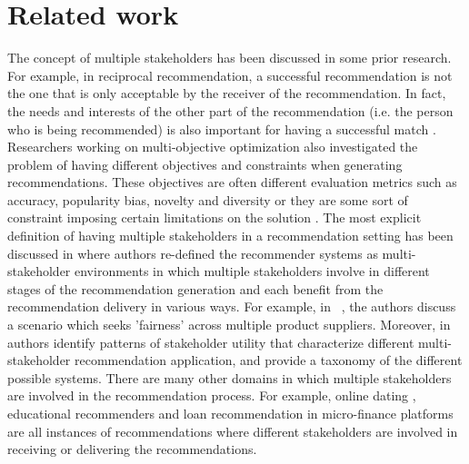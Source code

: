 \section{Related work}
The concept of multiple stakeholders has been discussed in some prior research. For example, in reciprocal recommendation, a successful recommendation is not the one that is only acceptable by the receiver of the recommendation. In fact, the needs and interests of the other part of the recommendation (i.e. the person who is being recommended) is also important for having a successful match \cite{reciprocal}. Researchers working on multi-objective optimization also investigated the problem of having different objectives and constraints when generating recommendations. These objectives are often different evaluation metrics such as accuracy, popularity bias, novelty and diversity \cite{jugovac2017efficient, biasRecSys2017} or they are some sort of constraint imposing certain limitations on the solution \cite{jambor2010optimizing}. The most explicit definition of having multiple stakeholders in a recommendation setting has been discussed in \cite{umapHimanMS} where authors re-defined the recommender systems as multi-stakeholder environments in which multiple stakeholders involve in different stages of the recommendation generation and each benefit from the recommendation delivery in various ways. For example, in ~\cite{DBLP:conf/um/BurkeAMG16}, the authors discuss a scenario which seeks 'fairness' across multiple product suppliers. Moreover, in \cite{vamsBurkeHiman} authors identify patterns of stakeholder utility that characterize different multi-stakeholder recommendation application, and provide a taxonomy of the different possible systems.  There are many other domains in which multiple stakeholders are involved in the recommendation process. For example, online dating \cite{reciprocal}, educational recommenders  \cite{burke2016educational} and loan recommendation in micro-finance platforms \cite{lee2014fairness} are all instances of recommendations where different stakeholders are involved in receiving or delivering the recommendations.

\begin{comment}
\section{Our goal in participating the workshop}
As one of the largest companies in the music recommendation domain, we think the value-Aware and Multi-stakeholder recommender systems could be a great venue to discuss the latest findings in this trending area of research and intend to have fruitful discussions during the workshop regarding potential solutions for similar problems we are facing in our company and also collaboration with other researchers participating in the workshop.  
\end{comment}

